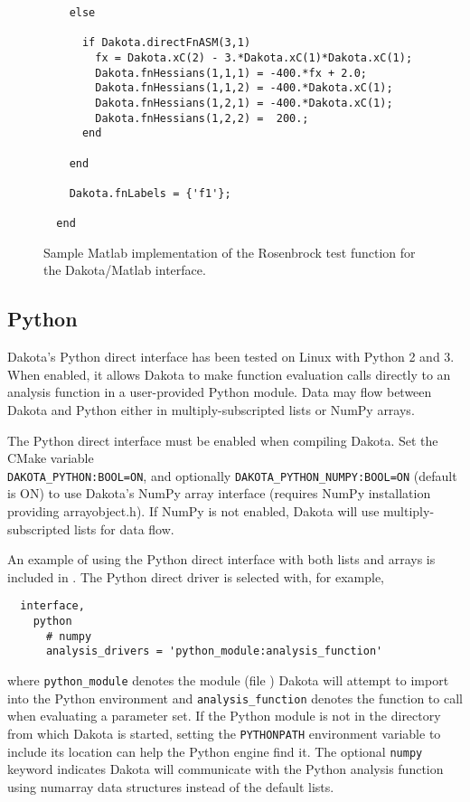 \begin{figure}
\begin{bigbox}
\begin{tiny}
\begin{verbatim}
    else
    
      if Dakota.directFnASM(3,1) 
        fx = Dakota.xC(2) - 3.*Dakota.xC(1)*Dakota.xC(1);
        Dakota.fnHessians(1,1,1) = -400.*fx + 2.0;
        Dakota.fnHessians(1,1,2) = -400.*Dakota.xC(1); 
        Dakota.fnHessians(1,2,1) = -400.*Dakota.xC(1);
        Dakota.fnHessians(1,2,2) =  200.;
      end
    
    end
  
    Dakota.fnLabels = {'f1'};
   
  end
\end{verbatim}
\end{tiny}
\end{bigbox}
\caption{Sample Matlab implementation of the Rosenbrock test function
for the Dakota/Matlab interface.\label{advint:figure:matlabrosen}}
\end{figure}

\subsection{Python}\label{advint:existingdirect:python} 

Dakota's Python direct interface has been tested on Linux with Python
2 and 3. When enabled, it allows Dakota to make function evaluation calls
directly to an analysis function in a user-provided Python module.
Data may flow between Dakota and Python either in multiply-subscripted
lists or NumPy arrays.

The Python direct interface must be enabled when compiling Dakota.
Set the CMake variable \\ {\tt DAKOTA\_PYTHON:BOOL=ON}, and optionally
{\tt DAKOTA\_PYTHON\_NUMPY:BOOL=ON} (default is ON) to use Dakota's
NumPy array interface (requires NumPy installation providing
arrayobject.h). If NumPy is not enabled, Dakota will use
multiply-subscripted lists for data flow.

An example of using the Python direct interface with both lists and
arrays is included in
. The Python direct driver is
selected with, for example,
\begin{verbatim}
  interface,
    python
      # numpy
      analysis_drivers = 'python_module:analysis_function'
\end{verbatim}
where {\tt python\_module} denotes the module (file
) Dakota will attempt to import into the Python
environment and {\tt analysis\_function} denotes the function to call
when evaluating a parameter set. If the Python module is not in the
directory from which Dakota is started, setting the {\tt PYTHONPATH}
environment variable to include its location can help the Python
engine find it.  The optional {\tt numpy} keyword indicates Dakota
will communicate with the Python analysis function using numarray data
structures instead of the default lists.

